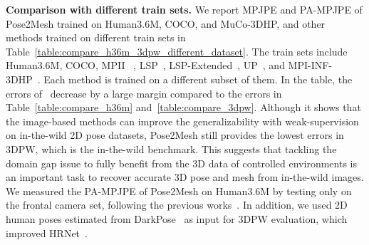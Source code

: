 \documentclass[runningheads]{llncs}
\begin{document}
\noindent\textbf{Comparison with different train sets.}
We report MPJPE and PA-MPJPE of Pose2Mesh trained on Human3.6M, COCO, and MuCo-3DHP, and other methods trained on different train sets in Table~\ref{table:compare_h36m_3dpw_different_dataset}. 
The train sets include Human3.6M, COCO, MPII~\cite{andriluka2014mpii} , LSP~\cite{johnson2010clustered}, LSP-Extended~\cite{johnson2011learning}, UP~\cite{lassner2017unite}, and MPI-INF-3DHP~\cite{mehta2017monocular}.
Each method is trained on a different subset of them. 
In the table, the errors of~\cite{kanazawa2018hmr,kolotouros2019cmr,kolotouros2019spin} decrease by a large margin compared to the errors in Table~\ref{table:compare_h36m} and~\ref{table:compare_3dpw}.
Although it shows that the image-based methods can improve the generalizability with weak-supervision on in-the-wild 2D pose datasets, Pose2Mesh still provides the lowest errors in 3DPW, which is the in-the-wild benchmark.
This suggests that tackling the domain gap issue to fully benefit from the 3D data of controlled environments is an important task to recover accurate 3D pose and mesh from in-the-wild images.
We measured the PA-MPJPE of Pose2Mesh on Human3.6M by testing only on the frontal camera set, following the previous works~\cite{kanazawa2018hmr,kolotouros2019cmr,kolotouros2019spin}.
In addition, we used 2D human poses estimated from DarkPose~\cite{zhang2020distribution} as input for 3DPW evaluation, which improved HRNet~\cite{sun2019deep}.
\end{document}
